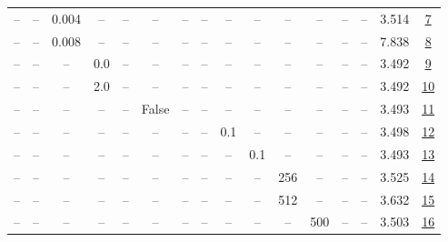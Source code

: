 \begin{table}[H]
\begin{tabular}{cccccccccccccccc}
-- & -- & 0.004 & -- & -- & -- & -- & -- & -- & -- & -- & -- & -- & -- & 3.514 & \href{https://wandb.ai/stanford-mercury/optimizer-scaling/runs/sweep-130m-2B-krone14983lr0.004-wd0.7-b10.95-plr0.2-pis1-gn1-nor-0f833d}{7} \\
-- & -- & 0.008 & -- & -- & -- & -- & -- & -- & -- & -- & -- & -- & -- & 7.838 & \href{https://wandb.ai/stanford-mercury/optimizer-scaling/runs/sweep-130m-2B-kroncc6d1clr0.008-wd0.7-b10.95-plr0.2-pis1-gn1-nor-5daa90}{8} \\
-- & -- & -- & 0.0 & -- & -- & -- & -- & -- & -- & -- & -- & -- & -- & 3.492 & \href{https://wandb.ai/stanford-mercury/optimizer-scaling/runs/sweep-130m-2B-kron42860dlr0.002-wd0.7-b10.95-plr0.2-pis1-gn0.0-n-66bad7}{9} \\
-- & -- & -- & 2.0 & -- & -- & -- & -- & -- & -- & -- & -- & -- & -- & 3.492 & \href{https://wandb.ai/stanford-mercury/optimizer-scaling/runs/sweep-130m-2B-kron39ffb0lr0.002-wd0.7-b10.95-plr0.2-pis1-gn2.0-n-4e30bb}{10} \\
-- & -- & -- & -- & -- & False & -- & -- & -- & -- & -- & -- & -- & -- & 3.493 & \href{https://wandb.ai/stanford-mercury/optimizer-scaling/runs/sweep-130m-2B-kron15f63alr0.002-wd0.7-b10.95-plr0.2-pis1-gn1-nor-c86fe3}{11} \\
-- & -- & -- & -- & -- & -- & -- & -- & 0.1 & -- & -- & -- & -- & -- & 3.498 & \href{https://wandb.ai/stanford-mercury/optimizer-scaling/runs/sweep-130m-2B-krone65b57lr0.002-wd0.7-b10.95-plr0.1-pis1-gn1-nor-83c7e9}{12} \\
-- & -- & -- & -- & -- & -- & -- & -- & -- & 0.1 & -- & -- & -- & -- & 3.493 & \href{https://wandb.ai/stanford-mercury/optimizer-scaling/runs/sweep-130m-2B-krone7ca20lr0.002-wd0.7-b10.95-plr0.2-pis1-gn1-nor-836663}{13} \\
-- & -- & -- & -- & -- & -- & -- & -- & -- & -- & 256 & -- & -- & -- & 3.525 & \href{https://wandb.ai/stanford-mercury/optimizer-scaling/runs/sweep-130m-2B-kron6a290elr0.002-wd0.7-b10.95-plr0.2-pis1-gn1-nor-00e7d9}{14} \\
-- & -- & -- & -- & -- & -- & -- & -- & -- & -- & 512 & -- & -- & -- & 3.632 & \href{https://wandb.ai/stanford-mercury/optimizer-scaling/runs/sweep-130m-2B-kronbe1c48lr0.002-wd0.7-b10.95-plr0.2-pis1-gn1-nor-6b988f}{15} \\
-- & -- & -- & -- & -- & -- & -- & -- & -- & -- & -- & 500 & -- & -- & 3.503 & \href{https://wandb.ai/stanford-mercury/optimizer-scaling/runs/sweep-130m-2B-kron8b3feelr0.002-wd0.7-b10.95-plr0.2-pis1-gn1-nor-dac9d4}{16} \\

\end{tabular}
\end{table}
